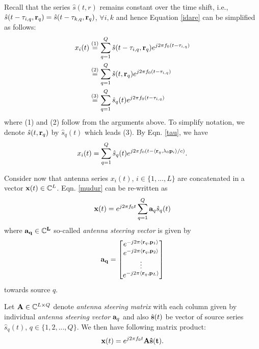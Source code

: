 \documentclass[11pt]{article}
\begin{document}
Recall that the series $\hat{s}(t,r)$ remains constant over the time shift, i.e., $\hat{s}(t-\tau_{i,q},{\bf r}_q) = \hat{s}(t-\tau_{k,q},{\bf r}_q)$, $\forall i,k$ and hence Equation \ref{idare} can be simplified as follows:
\begin{equation}
\begin{split}
x_i(t) &\stackrel{(1)}{=} \sum_{q=1}^Q \hat{s}(t-\tau_{i,q},{\bf r}_q)e^{j2\pi f_0 (t-\tau_{i,q})}\\
&\stackrel{(2)}{=} \sum_{q=1}^Q \hat{s}(t, {\bf r}_q)e^{j2\pi f_0 (t-\tau_{i,q})}\\
&\stackrel{(3)}{=} \sum_{q=1}^Q \hat{s}_q(t)e^{j2\pi f_0 (t-\tau_{i,q})}
\end{split}
\end{equation}
where (1) and (2) follow from the arguments above. To simplify notation, we denote $\hat{s}(t,{\bf r}_q)$ by $\hat{s}_q(t)$ which leads (3).
By Eqn. \ref{tau}, we have
\begin{equation}\label{mudur}
x_i(t) = \sum_{q=1}^Q \hat{s}_q(t)e^{j2\pi f_0 (t- \langle {\bf r}_q,\lambda_0{\bf p}_i\rangle/c)}.
\end{equation}
 
Consider now that antenna series $x_i(t)$, $i\in \{ 1,...,L\}$ are concatenated in a vector ${\bf x}(t) \in \mathbb{C}^L$. Eqn. \ref{mudur} can be re-written as
 \begin{equation}
{\bf x}(t) = e^{j2\pi f_0 t} \sum_{q=1}^Q {\bf a}_q \hat{s}_q(t)\label{ind_xt}
\end{equation}
where $\bf{a}_q \in \mathbb{C}^L$ so-called {\it antenna steering vector} is given by
\begin{equation}\label{steering}
\bf{a}_q =
  \begin{bmatrix}
    e^{-j2\pi \langle {\bf r}_q, {\bf p}_1 \rangle}   \\
    e^{-j2\pi \langle {\bf r}_q, {\bf p}_2 \rangle}    \\
    \vdots \\
    e^{-j2\pi \langle {\bf r}_q, {\bf p}_L \rangle}   
  \end{bmatrix}
 \end{equation}
 towards source $q$.
 
Let ${\bf A} \in \mathbb{C}^{L\times Q}$ denote {\it antenna steering matrix} with each column given by individual {\it antenna steering vector} ${\bf a}_q$ and also $\hat{\bf{s}}(t)$ be vector of source series $\hat{s}_q(t)$, $q \in \{ 1,2,...,Q \}$. We then have following matrix product:
 \begin{equation}
 {\bf x}(t) = e^{j2\pi f_0 t}\bf{A} \hat{\bf{s}}(t).
 \end{equation}
 
\end{document}
